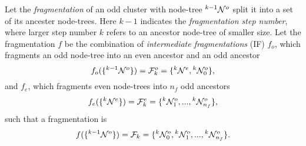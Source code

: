 




\begin{definition}\label{def:fragmentation}
  Let the \emph{fragmentation} of an odd cluster with node-tree ${}^{k-1}\mathcal{N}^o$ split it into a set of its ancester node-trees. Here $k-1$ indicates the \emph{fragmentation step number}, where larger step number $k$ refers to an ancestor node-tree of smaller size. Let the fragmentation $f$ be the combination of \emph{intermediate fragmentations} (IF) $f_o$, which fragments an odd node-tree into an even ancestor and an odd ancestor
  \begin{equation}\label{eq:pfo}
    f_o(\{\pre{k-1}\nset^o\}) = \m{F}^o_k = \{\pre{k}\nset^e, \pre{k}\nset^o_0 \}, 
  \end{equation}
  and $f_e$, which fragments even node-trees into $n_f$ odd ancestors
  \begin{equation}\label{eq:pfe}
    f_e(\{\pre{k}\nset^e\}) = \m{F}^e_k=\{\pre{k}\nset^{o}_1,...,\pre{k}\nset^o_{n_f}\},
  \end{equation}
  such that a fragmentation is
  \begin{equation}\label{eq:fstep}
    f(\{\pre{k-1}\nset^o\}) = \m{F}_k = \{\pre{k}\nset^o_0,\pre{k}\nset^{o}_1,...,\pre{k}\nset^{o}_{n_f}\}.
  \end{equation}
\end{definition}

